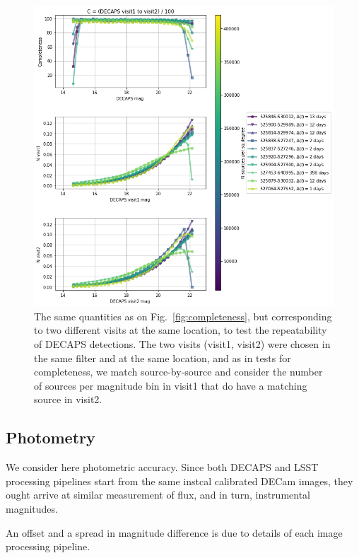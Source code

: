 \documentclass[DM,lsstdraft,toc,usenatbib]{lsstdoc}
\begin{document}
\begin{figure}
\begin{centering}
\includegraphics[width=0.75\columnwidth]{figs/completeness_3_decaps.png}
\caption{The same quantities as on Fig.~\ref{fig:completeness}, but corresponding to two different visits at the same location, to test the repeatability of DECAPS detections. The two visits (visit1, visit2) were chosen in the same filter and at the same location, and as in tests for completeness, we match source-by-source and consider the number of sources per magnitude bin in visit1 that do have a matching source in visit2. }
\label{fig:completeness_decaps}
\end{centering}
\end{figure} 




\subsection{Photometry}
\label{sec:photometry}

We consider here photometric accuracy. Since both DECAPS and LSST processing pipelines start from the same instcal calibrated DECam images, they ought arrive at similar measurement of flux, and in turn, instrumental magnitudes.  

An offset and a spread in magnitude difference is due to details of each image processing pipeline.
\end{document}
